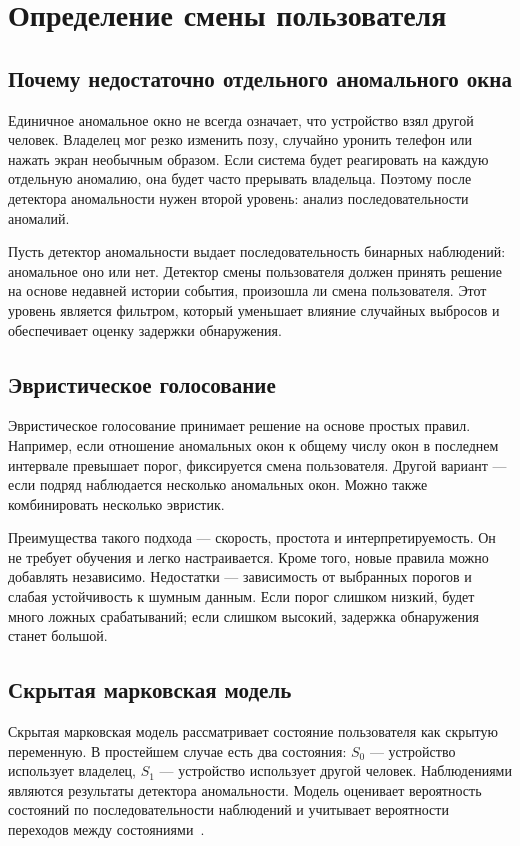 \documentclass[oneside,senior,etd]{BYUPhys}
\begin{document}
\section{Определение смены пользователя}

\subsection{Почему недостаточно отдельного аномального окна}

Единичное аномальное окно не всегда означает, что устройство взял другой человек. Владелец мог резко изменить позу, случайно уронить телефон или нажать экран необычным образом. Если система будет реагировать на каждую отдельную аномалию, она будет часто прерывать владельца. Поэтому после детектора аномальности нужен второй уровень: анализ последовательности аномалий.

Пусть детектор аномальности выдает последовательность бинарных наблюдений: аномальное оно или нет. Детектор смены пользователя должен принять решение на основе недавней истории события, произошла ли смена пользователя. Этот уровень является фильтром, который уменьшает влияние случайных выбросов и обеспечивает оценку задержки обнаружения.

\subsection{Эвристическое голосование}

Эвристическое голосование принимает решение на основе простых правил. Например, если отношение аномальных окон к общему числу окон в последнем интервале превышает порог, фиксируется смена пользователя. Другой вариант --- если подряд наблюдается несколько аномальных окон. Можно также комбинировать несколько эвристик.

Преимущества такого подхода --- скорость, простота и интерпретируемость. Он не требует обучения и легко настраивается. Кроме того, новые правила можно добавлять независимо. Недостатки --- зависимость от выбранных порогов и слабая устойчивость к шумным данным. Если порог слишком низкий, будет много ложных срабатываний; если слишком высокий, задержка обнаружения станет большой.

\subsection{Скрытая марковская модель}

Скрытая марковская модель рассматривает состояние пользователя как скрытую переменную. В простейшем случае есть два состояния: $S_0$ --- устройство использует владелец, $S_1$ --- устройство использует другой человек. Наблюдениями являются результаты детектора аномальности. Модель оценивает вероятность состояний по последовательности наблюдений и учитывает вероятности переходов между состояниями~\cite{rabiner1989hmm}.
\end{document}
